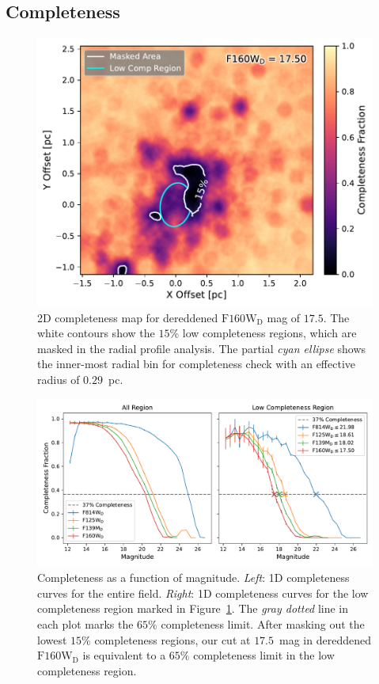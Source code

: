 \documentclass[12pt]{ucsddissertation}
\begin{document}
\begin{CJK*}{UTF8}{gbsn}
\subsection{Completeness}
\label{wd1-subsec:completeness}

\begin{figure}[htb!]
    \centering
    \includegraphics[width = 0.7\linewidth]{figures/chapter2/2D_completeness_F160W_0.15.pdf}
    \caption[Completeness map of Wd1]{2D completeness map for dereddened $\mathrm{F160W_D}$ mag of $17.5$. The white contours show the $15\%$ low completeness regions, which are masked in the radial profile analysis. The partial {\em cyan ellipse} shows the inner-most radial bin for completeness check with an effective radius of $0.29$~pc.}
    \label{fig:2D_completess}
\end{figure}

\begin{figure}[htb!]
    \centering
    \includegraphics[width = \linewidth]{figures/chapter2/Completeness_Curves.pdf}
    \caption[Completeness vs. magnitude]{Completeness as a function of magnitude. {\em Left}: 1D completeness curves for the entire field. {\em Right}: 1D completeness curves for the low completeness region marked in Figure~\ref{fig:2D_completess}. The {\em gray dotted} line in each plot marks the $65\%$ completeness limit. After masking out the lowest $15\%$ completeness regions, our cut at $17.5$~mag in dereddened $\mathrm{F160W_D}$ is equivalent to a $65\%$ completeness limit in the low completeness region.}
    \label{fig:1D_comp_curves}
\end{figure}


\end{CJK*}
\end{document}

